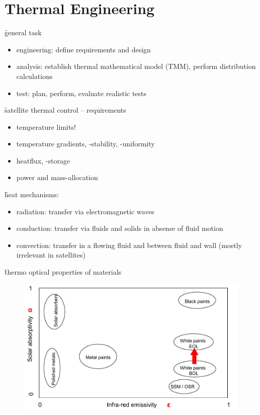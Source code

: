 \section{Thermal Engineering}
\f{general task}
\begin{itemize}
 \item engineering: define requirements and design
 \item analysis: establish thermal mathematical model (TMM), perform distribution calculations
 \item test: plan, perform, evaluate realistic tests
\end{itemize}

\f{satellite thermal control -- requirements}
\begin{itemize}
 \item temperature limits!
 \item temperature gradients, -stability, -uniformity
 \item heatflux, -storage
 \item power and mass-allocation
\end{itemize}

\f{heat mechanisms:}
\begin{itemize}
 \item radiation: transfer via electromagnetic waves
 \item conduction: transfer via fluids and solids in absense of fluid motion
 \item convection: transfer in a flowing fluid and between fluid and wall (mostly irrelevant in satellites)
\end{itemize}

\f{thermo optical properties of materials}
\begin{figure}[ht!]
 \centering
 \includegraphics[scale=0.6]{thermooptical}
\end{figure}

